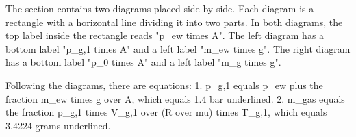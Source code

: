 The section contains two diagrams placed side by side. Each diagram is a rectangle with a horizontal line dividing it into two parts. In both diagrams, the top label inside the rectangle reads "p_ew times A". The left diagram has a bottom label "p_g,1 times A" and a left label "m_ew times g". The right diagram has a bottom label "p_0 times A" and a left label "m_g times g".

Following the diagrams, there are equations:
1. p_g,1 equals p_ew plus the fraction m_ew times g over A, which equals 1.4 bar underlined.
2. m_gas equals the fraction p_g,1 times V_g,1 over (R over mu) times T_g,1, which equals 3.4224 grams underlined.